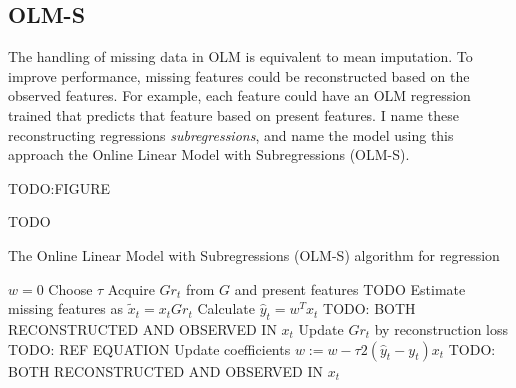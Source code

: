 %
%
%
%
%
\subsection{OLM-S}
The handling of missing data in OLM is equivalent to mean imputation. To
improve performance, missing features could be reconstructed based on the
observed features. For example, each feature could have an OLM regression
trained that predicts that feature based on present features. I name these
reconstructing regressions \emph{subregressions}, and name the model using this
approach the Online Linear Model with Subregressions (OLM-S). 

TODO:FIGURE 

TODO


\begin{algorithm}
  \caption{The Online Linear Model with Subregressions (OLM-S) algorithm for regression}\label{alg:olm-s-regression}
  \begin{algorithmic}
    \State $w=0$ 
    \State Choose $\tau$
      \State Acquire $Gr_t$ from $G$ and present features TODO
      \State Estimate missing features as $\tilde x_t = x_t Gr_t$
      \State Calculate $\hat y_t = w^T x_t$ TODO: BOTH RECONSTRUCTED AND OBSERVED IN $x_t$
      \State Update $Gr_t$ by reconstruction loss TODO: REF EQUATION
      \State Update coefficients $w := w - \tau 2 (\hat y_t - y_t) x_t$ TODO: BOTH RECONSTRUCTED AND OBSERVED IN $x_t$
    \EndFor

  \end{algorithmic}
\end{algorithm}

